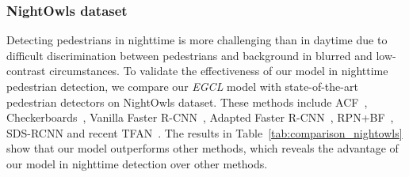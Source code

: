 \documentclass[journal]{IEEEtran}
\newcommand{\MR}[1]{\textcolor[rgb]{0,0,0} {#1}}
\begin{document}
\subsubsection{NightOwls dataset}
Detecting pedestrians in nighttime is more challenging than in daytime due to difficult discrimination between pedestrians and background in blurred and low-contrast circumstances. To validate the effectiveness of our model in nighttime pedestrian detection, we compare our \emph{EGCL} model with state-of-the-art pedestrian detectors on NightOwls dataset. These methods include ACF~\cite{dollar2014fast}, Checkerboards~\cite{zhang2015filtered}, Vanilla Faster R-CNN~\cite{ren2016faster}, Adapted Faster R-CNN~\cite{zhang2017citypersons}, RPN+BF~\cite{zhang2016faster}, SDS-RCNN\cite{brazil2017illuminating} and recent TFAN~\cite{wu2020temporal}.
The results in Table~\ref{tab:comparison_nightowls} show that \MR{our model outperforms other methods}, which reveals the advantage of our model in nighttime  detection over other methods. 




\begin{table}[!t]
\centering
\caption{Performance ( in terms of $MR^{-2}$) of our \emph{EGCL} and other methods on TJU-DHD-pedestrian dataset including two sub-datasets (lower is better).}
\renewcommand\arraystretch{1.5} 
\label{tab:sota-tju}
\end{table}
\end{document}
